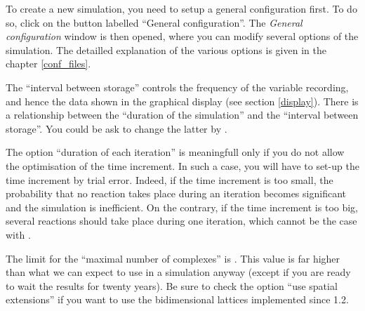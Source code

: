 To create a new
simulation, you need to setup a general configuration first. To do so, click on
the button labelled ``General configuration''.  
The \emph{General configuration} window is then opened, where you can modify
several options of the simulation.  The detailled explanation of the various
options is given in the chapter \ref{conf_files}. 

The ``interval between storage'' controls the frequency of the variable
recording, and hence the data shown in the graphical display (see section
\ref{display}). There is a relationship between the ``duration of the
simulation'' and the ``interval between storage''. You could be ask to change
the latter by \stochsim.

The option ``duration of each iteration'' is meaningfull only if you do not
allow the optimisation of the time increment. In such a case, you will have to
set-up the time increment by trial error. Indeed, if the time increment is too
small, the probability that no reaction takes place during an iteration becomes
significant and the simulation is inefficient. On the contrary, if the time
increment is too big, several reactions should take place during one iteration,
which cannot be the case with \stochsim{}. 

The limit for the ``maximal number of complexes'' is \MAXLIMITCOMPLEXES. This
value is far higher than what we can expect to use in a \stochsim{} simulation
anyway (except if you are ready to wait the results for twenty years). Be sure
to check the option ``use spatial extensions'' if you want to use the
bidimensional lattices implemented since \stochsim{} 1.2.

